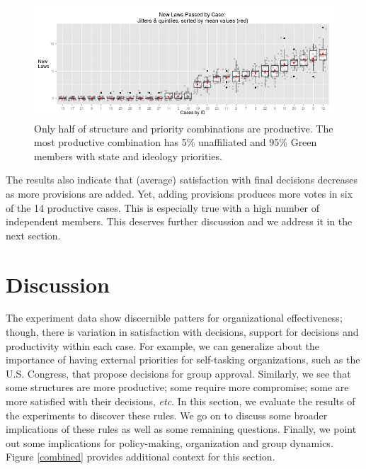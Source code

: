 \documentclass[pdftex,12pt]{llncs}
\begin{document}
\begin{figure}[h]
\centering
\includegraphics[width=4.9in]{laws_byJob_jitterQuints.png}
\caption[ ]{Only half of structure and priority combinations are productive. The most productive combination has 5\% unaffiliated and 95\% Green members with state and ideology priorities.} 
\label{lawspassed}
\end{figure}
 
  
The results also indicate that (average) satisfaction with final decisions decreases as more provisions are added.
Yet, adding provisions produces more votes in six of the 14 productive cases. 
This is especially true with a high number of independent members.  
This deserves further discussion and we address it in the next section.



\section{Discussion}
%
The experiment data show discernible patters for organizational effectiveness; though, there is variation in satisfaction with decisions, support for decisions and productivity within each case.
For example, we can generalize about the importance of having external priorities for self-tasking organizations, such as the U.S. Congress, that propose decisions for group approval. 
Similarly, we see that some structures are more productive; some require more compromise; some are more satisfied with their decisions, \textit{etc}. 
In this section, we evaluate the results of the experiments to discover these rules. 
We go on to discuss some broader implications of these rules as well as some remaining questions.
Finally, we point out some implications for policy-making, organization and group dynamics. 
Figure \ref{combined} provides additional context for this section.
\end{document}
